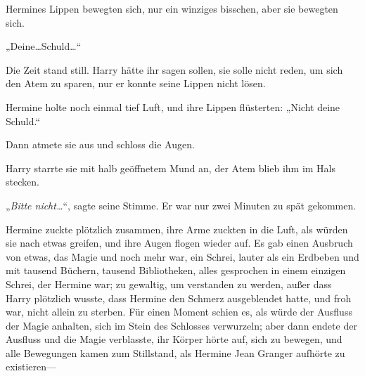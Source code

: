 Hermines Lippen bewegten sich, nur ein winziges bisschen, aber sie bewegten sich.

„Deine…Schuld…“

Die Zeit stand still. Harry hätte ihr sagen sollen, sie solle nicht reden, um sich den Atem zu sparen, nur er konnte seine Lippen nicht lösen.

Hermine holte noch einmal tief Luft, und ihre Lippen flüsterten:
„Nicht deine Schuld.“

Dann atmete sie aus und schloss die Augen.

Harry starrte sie mit halb geöffnetem Mund an, der Atem blieb ihm im Hals stecken.

„\emph{Bitte nicht…}“, sagte seine Stimme. Er war nur zwei Minuten zu spät gekommen.

Hermine zuckte plötzlich zusammen, ihre Arme zuckten in die Luft, als würden sie nach etwas greifen, und ihre Augen flogen wieder auf. Es gab einen Ausbruch von etwas, das Magie und noch mehr war, ein Schrei, lauter als ein Erdbeben und mit tausend Büchern, tausend Bibliotheken, alles gesprochen in einem einzigen Schrei, der Hermine war; zu gewaltig, um verstanden zu werden, außer dass Harry plötzlich wusste, dass Hermine den Schmerz ausgeblendet hatte, und froh war, nicht allein zu sterben. Für einen Moment schien es, als würde der Ausfluss der Magie anhalten, sich im Stein des Schlosses verwurzeln; aber dann endete der Ausfluss und die Magie verblasste, ihr Körper hörte auf, sich zu bewegen, und alle Bewegungen kamen zum Stillstand, als Hermine Jean Granger aufhörte zu existieren—

